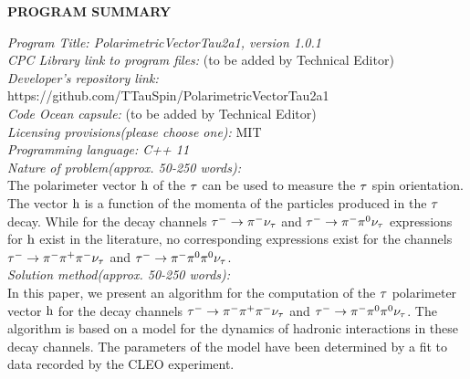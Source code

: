 \ifx\ver\verPAPER
{\bf PROGRAM SUMMARY} \\
\begin{small}
\noindent
{\em Program Title: PolarimetricVectorTau2a1, version 1.0.1} \\
{\em CPC Library link to program files:} (to be added by Technical Editor) \\
{\em Developer's repository link:} https://github.com/TTauSpin/PolarimetricVectorTau2a1 \\
{\em Code Ocean capsule:} (to be added by Technical Editor)\\
{\em Licensing provisions(please choose one):} 
MIT \\
{\em Programming language: C++ 11} \\
{\em Nature of problem(approx. 50-250 words):}\\
  The polarimeter vector $\textrm{h}$ of the $\tau$ can be used to measure the $\tau$ spin orientation.
  The vector $\textrm{h}$ is a function of the momenta of the particles produced in the $\tau$ decay.
  While for the decay channels $\tau^{-} \to \pi^{-}\nu_{\tau}$ and $\tau^{-} \to \pi^{-}\pi^{\textrm{0}}\nu_{\tau}$ expressions for $\textrm{h}$ exist in the literature,
  no corresponding expressions exist for the channels $\tau^{-} \to \pi^{-}\pi^{+}\pi^{-}\nu_{\tau}$ and $\tau^{-} \to \pi^{-}\pi^{\textrm{0}}\pi^{\textrm{0}}\nu_{\tau}$. \\
{\em Solution method(approx. 50-250 words):}\\
  In this paper, we present an algorithm for the computation of the $\tau$ polarimeter vector $\textrm{h}$ for the decay channels $\tau^{-} \to \pi^{-}\pi^{+}\pi^{-}\nu_{\tau}$ and $\tau^{-} \to \pi^{-}\pi^{\textrm{0}}\pi^{\textrm{0}}\nu_{\tau}$.
  The algorithm is based on a model for the dynamics of hadronic interactions in these decay channels.
  The parameters of the model have been determined by a fit to data recorded by the CLEO experiment.
   \\
\end{small}   
\fi


